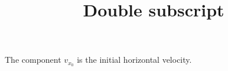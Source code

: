 \documentclass{handout}
\title{Double subscript}
\begin{document}
\maketitle
The component $v_x_0$ is the initial horizontal velocity.
\end{document}
